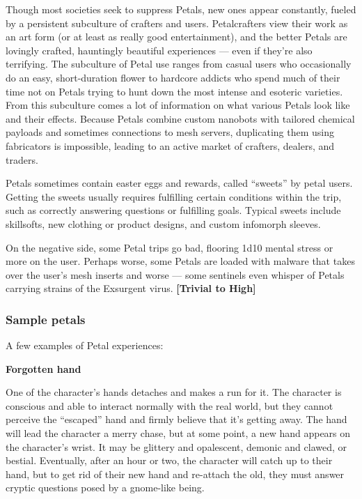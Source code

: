 {{Though most societies seek to suppress Petals, new ones appear constantly, fueled by a persistent subculture of crafters and users. Petalcrafters view their work as an art form (or at least as really good entertainment), and the better Petals are lovingly crafted, hauntingly beautiful experiences --- even if they’re also terrifying. The subculture of Petal use ranges from casual users who occasionally do an easy, short-duration flower to hardcore addicts who spend much of their time not on Petals trying to hunt down the most intense and esoteric varieties. From this subculture comes a lot of information on what various Petals look like and their effects. Because Petals combine custom nanobots with tailored chemical payloads and sometimes connections to mesh servers, duplicating them using fabricators is impossible, leading to an active market of crafters, dealers, and traders. 

Petals sometimes contain easter eggs and rewards, called ``sweets'' by petal users. Getting the sweets usually requires fulfilling certain conditions within the trip, such as correctly answering questions or fulfilling goals. Typical sweets include skillsofts, new clothing or product designs, and custom infomorph sleeves. 

On the negative side, some Petal trips go bad, flooring 1d10 mental stress or more on the user. Perhaps worse, some Petals are loaded with malware that takes over the user’s mesh inserts and worse --- some sentinels even whisper of Petals carrying strains of the Exsurgent virus. \textbf{[Trivial to High]} 

\subsubsection{Sample petals} 

A few examples of Petal experiences: 

\textbf{Forgotten hand} 

One of the character’s hands detaches and makes a run for it. The character is conscious and able to interact normally with the real world, but they cannot perceive the ``escaped'' hand and firmly believe that it’s getting away. The hand will lead the character a merry chase, but at some point, a new hand appears on the character’s wrist. It may be glittery and opalescent, demonic and clawed, or bestial. Eventually, after an hour or two, the character will catch up to their hand, but to get rid of their new hand and re-attach the old, they must answer cryptic questions posed by a gnome-like being. 

}}
